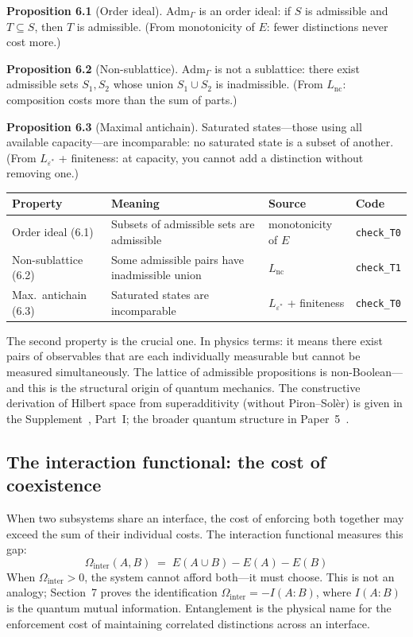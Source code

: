\documentclass[11pt]{article}
\newcommand{\Adm}{\mathrm{Adm}}
\begin{document}
\textbf{Proposition 6.1} (Order ideal).  $\Adm_\Gamma$ is an order ideal: if $S$ is admissible and $T \subseteq S$, then $T$ is admissible.  (From monotonicity of $E$: fewer distinctions never cost more.)

\textbf{Proposition 6.2} (Non-sublattice).  $\Adm_\Gamma$ is not a sublattice: there exist admissible sets $S_1, S_2$ whose union $S_1 \cup S_2$ is inadmissible.  (From $L_{\mathrm{nc}}$: composition costs more than the sum of parts.)

\textbf{Proposition 6.3} (Maximal antichain).  Saturated states---those using all available capacity---are incomparable: no saturated state is a subset of another.  (From $L_{\varepsilon^*}$ + finiteness: at capacity, you cannot add a distinction without removing one.)

\smallskip
\begin{center}
\small
\begin{tabular}{lp{4.2cm}ll}
\toprule
\textbf{Property} & \textbf{Meaning} & \textbf{Source} & \textbf{Code} \\
\midrule
Order ideal (6.1) & Subsets of admissible sets are admissible & monotonicity of $E$ & \texttt{check\_T0} \\
Non-sublattice (6.2) & Some admissible pairs have inadmissible union & $L_{\mathrm{nc}}$ & \texttt{check\_T1} \\
Max.\ antichain (6.3) & Saturated states are incomparable & $L_{\varepsilon^*}$ + finiteness & \texttt{check\_T0} \\
\bottomrule
\end{tabular}
\end{center}
\smallskip

The second property is the crucial one.  In physics terms: it means there exist pairs of observables that are each individually measurable but cannot be measured simultaneously.  The lattice of admissible propositions is non-Boolean---and this is the structural origin of quantum mechanics.  The constructive derivation of Hilbert space from superadditivity (without Piron--Sol\`er) is given in the Supplement~\cite{Supp}, Part~I; the broader quantum structure in Paper~5~\cite{P5}.


\subsection{The interaction functional: the cost of coexistence}

When two subsystems share an interface, the cost of enforcing both together may exceed the sum of their individual costs.  The interaction functional measures this gap:
\begin{equation}
\Omega_{\mathrm{inter}}(A,B) \;=\; E(A \cup B) - E(A) - E(B)
\end{equation}
When $\Omega_{\mathrm{inter}} > 0$, the system cannot afford both---it must choose.  This is not an analogy; Section~7 proves the identification $\Omega_{\mathrm{inter}} = -I(A{:}B)$, where $I(A{:}B)$ is the quantum mutual information.  Entanglement is the physical name for the enforcement cost of maintaining correlated distinctions across an interface.
\end{document}
